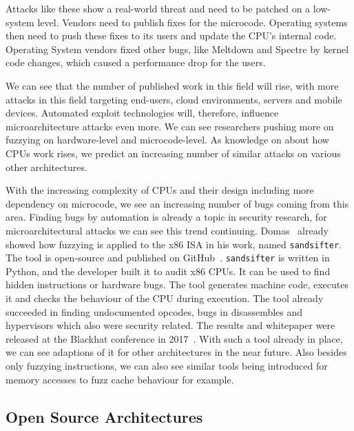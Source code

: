 Attacks like these show a real-world threat and need to be patched on a
low-system level. Vendors need to publish fixes for the microcode. Operating
systems then need to push these fixes to its users and update the CPU's internal
code. Operating System vendors fixed other bugs, like Meltdown and Spectre by
kernel code changes, which caused a performance drop for the users.

We can see that the number of published work in this field will rise, with more
attacks in this field targeting end-users, cloud environments, servers and
mobile devices. Automated exploit technologies will, therefore, influence
microarchitecture attacks even more. We can see researchers pushing more on
fuzzying on hardware-level and microcode-level. As knowledge on about how CPUs
work rises, we predict an increasing number of similar attacks on various other
architectures.

With the increasing complexity of CPUs and their design including more
dependency on microcode, we see an increasing number of bugs coming from this
area. Finding bugs by automation is already a topic in security research, for
microarchitectural attacks we can see this trend continuing.
Domas~\cite{sandsifter} already showed how fuzzying is applied to the x86 ISA in
his work, named \texttt{sandsifter}. The tool is open-source and published on
GitHub~\cite{sandsifterurl}. \texttt{sandsifter} is written in Python, and the
developer built it to audit x86 CPUs. It can be used to find hidden instructions
or hardware bugs. The tool generates machine code, executes it and checks the
behaviour of the CPU during execution. The tool already succeeded in finding
undocumented opcodes, bugs in disassembles and hypervisors which also were
security related. The results and whitepaper were released at the Blackhat
conference in 2017~\cite{sandsifter}. With such a tool already in place, we can
see adaptions of it for other architectures in the near future. Also besides
only fuzzying instructions, we can also see similar tools being introduced for
memory accesses to fuzz cache behaviour for example.

\subsection{Open Source Architectures}

